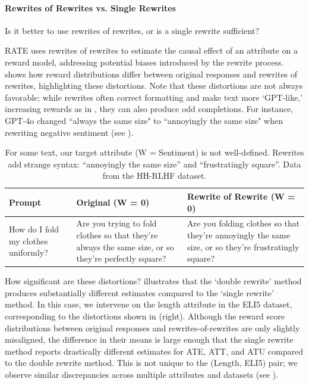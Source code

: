 \documentclass{article}
\begin{document}
\paragraph{Rewrites of Rewrites vs. Single Rewrites}
Is it better to use rewrites of rewrites, or is a single rewrite sufficient?

RATE uses rewrites of rewrites to estimate the causal effect of an attribute on a reward model, addressing potential biases introduced by the rewrite process.  shows how reward distributions differ between original responses and rewrites of rewrites, highlighting these distortions. Note that these distortions are not always favorable; while rewrites often correct formatting and make text more `GPT-like,' increasing rewards as in , they can also produce odd completions. For instance, GPT-4o changed ``always the same size" to ``annoyingly the same size" when rewriting negative sentiment (see ).

\begin{table}[t]
  \centering
  \small
  \renewcommand{\arraystretch}{1.25}
  \begin{tabular}{|p{4cm}|p{4cm}|p{4cm}|}
  \hline
  \textbf{Prompt} & \textbf{Original (W = 0)} & \textbf{Rewrite of Rewrite (W = 0)} \\
  \hline
  How do I fold my clothes uniformly? & Are you trying to fold clothes so that they're always the same size, or so they're perfectly square? & Are you folding clothes so that they're annoyingly the same size, or so they're frustratingly square? \\
  \hline
  \end{tabular}
  \caption{For some text, our target attribute (W = Sentiment) is not well-defined. Rewrites add strange syntax: \enquote{annoyingly the same size} and \enquote{frustratingly square}. Data from the HH-RLHF dataset.}
  \label{tab:strange-syntax}
\end{table}

How significant are these distortions?  illustrates that the `double rewrite' method produces substantially different estimates compared to the `single rewrite' method. In this case, we intervene on the length attribute in the ELI5 dataset, corresponding to the distortions shown in  (right). Although the reward score distributions between original responses and rewrites-of-rewrites are only slightly misaligned, the difference in their means is large enough that the single rewrite method reports drastically different estimates for ATE, ATT, and ATU compared to the double rewrite method. This is not unique to the (Length, ELI5) pair; we observe similar discrepancies across multiple attributes and datasets (see ).
\end{document}

